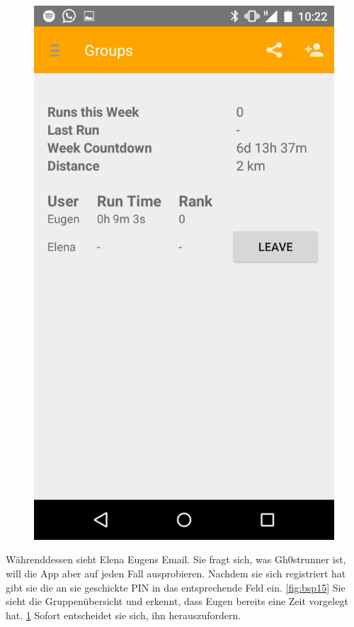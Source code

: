 \begin{figure}
\begin{minipage}{.4\textwidth}
  \includegraphics[width=.8\linewidth]{abb/bsp/bsp16}
  \label{fig:bsp16}
\end{minipage}
\end{figure}

Währenddessen sieht Elena Eugens Email. Sie fragt sich, was Gh0strunner ist, will die App aber auf jeden Fall ausprobieren. Nachdem sie sich registriert hat gibt sie die an sie geschickte PIN in das entsprechende Feld ein. \ref{fig:bsp15} Sie sieht die Gruppenübersicht und erkennt, dass Eugen bereits eine Zeit vorgelegt hat. \ref{fig:bsp16} Sofort entscheidet sie sich, ihn herauszufordern.


